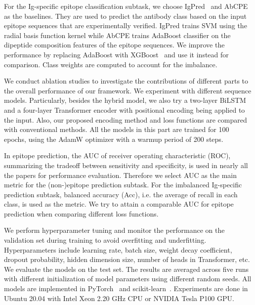 \documentclass[runningheads]{llncs}
\begin{document}
For the Ig-specific epitope classification subtask, we choose IgPred~\cite{gupta2013identification} and AbCPE~\cite{kadam2021antibody} as the baselines. They are used to predict the antibody class based on the input epitope sequences that are experimentally verified. IgPred trains SVM using the radial basis function kernel while AbCPE trains AdaBoost classifier on the dipeptide composition features of the epitope sequences. We improve the performance by replacing AdaBoost with XGBoost~\cite{chen2016xgboost} and use it instead for comparison. Class weights are computed to account for the imbalance.

We conduct ablation studies to investigate the contributions of different parts to the overall performance of our framework. We experiment with different sequence models. Particularly, besides the hybrid model, we also try a two-layer BiLSTM and a four-layer Transformer encoder with positional encoding being applied to the input. Also, our proposed encoding method and loss functions are compared with conventional methods. All the models in this part are trained for 100 epochs, using the AdamW optimizer with a warmup period of 200 steps.

In epitope prediction, the AUC of receiver operating characteristic (ROC), summarizing the tradeoff between sensitivity and specificity, is used in nearly all the papers for performance evaluation. Therefore we select AUC as the main metric for the (non-)epitope prediction subtask. For the imbalanced Ig-specific prediction subtask, balanced accuracy (Acc), i.e. the average of recall in each class, is used as the metric. We try to attain a comparable AUC for epitope prediction when comparing different loss functions.

We perform hyperparameter tuning and monitor the performance on the validation set during training to avoid overfitting and underfitting. Hyperparameters include learning rate, batch size, weight decay coefficient, dropout probability, hidden dimension size, number of heads in Transformer, etc. We evaluate the models on the test set. The results are averaged across five runs with different initialization of model parameters using different random seeds. All models are implemented in PyTorch~\cite{paszke2019pytorch} and scikit-learn~\cite{pedregosa2011scikit}. Experiments are done in Ubuntu 20.04 with Intel Xeon 2.20 GHz CPU or NVIDIA Tesla P100 GPU.
\end{document}
